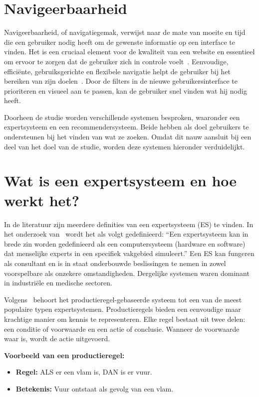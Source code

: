 \section{Navigeerbaarheid}
Navigeerbaarheid, of navigatiegemak, verwijst naar de mate van moeite en tijd die een gebruiker nodig heeft om de gewenste informatie op een interface te vinden. Het is een cruciaal element voor de kwaliteit van een website en essentieel om ervoor te zorgen dat de gebruiker zich in controle voelt~\autocite{Zachrison2022}. Eenvoudige, efficiënte, gebruiksgerichte en flexibele navigatie helpt de gebruiker bij het bereiken van zijn doelen~\autocite{Pearson2007}. Door de filters in de nieuwe gebruikersinterface te prioriteren en visueel aan te passen, kan de gebruiker snel vinden wat hij nodig heeft.\par
\bigskip
Doorheen de studie worden verschillende systemen besproken, waaronder een expertsysteem en een recommendersysteem. Beide hebben als doel gebruikers te ondersteunen bij het vinden van wat ze zoeken. Omdat dit nauw aansluit bij een deel van het doel van de studie, worden deze systemen hieronder verduidelijkt.

\section{Wat is een expertsysteem en hoe werkt het?}
In de literatuur zijn meerdere definities van een expertsysteem (ES) te vinden. In het onderzoek van~\textcite[p.~2]{Castillo2012} wordt het als volgt gedefinieerd: “Een expertsysteem kan in brede zin worden gedefinieerd als een computersysteem (hardware en software) dat menselijke experts in een specifiek vakgebied simuleert.” Een ES kan fungeren als consultant en is in staat onderbouwde beslissingen te nemen in zowel voorspelbare als onzekere omstandigheden. Dergelijke systemen waren dominant in industriële en medische sectoren.

Volgens~\textcite{Erdani2012} behoort het productieregel-gebaseerde systeem tot een van de meest populaire typen expertsystemen. Productieregels bieden een eenvoudige maar krachtige manier om kennis te representeren. Elke regel bestaat uit twee delen: een conditie of voorwaarde en een actie of conclusie. Wanneer de voorwaarde waar is, wordt de actie uitgevoerd.\par
\medskip
\textbf{Voorbeeld van een productieregel:}
\begin{itemize}
    \item \textbf{Regel:} ALS er een vlam is, DAN is er vuur.
    \item \textbf{Betekenis:} Vuur ontstaat als gevolg van een vlam.
\end{itemize}

